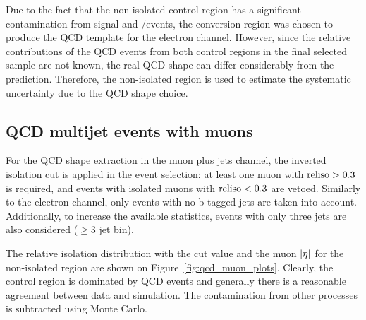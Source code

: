 Due to the fact that the non-isolated control region has a significant contamination from signal and \W/\ZpJets events,
the conversion region was chosen to produce the QCD template for the electron channel. However, since the relative
contributions of the QCD events from both control regions in the final selected sample are not known, the real QCD shape
can differ considerably from the prediction. Therefore, the non-isolated region is used to estimate the systematic
uncertainty due to the QCD shape choice.

\subsection{QCD multijet events with muons}
For the QCD shape extraction in the muon plus jets channel, the inverted isolation cut is applied in the event
selection: at least one muon with $\textrm{reliso}>0.3$ is required, and events with isolated muons with $\textrm{reliso}<0.3$ are
vetoed. Similarly to the electron channel, only events with no b-tagged jets are taken into account. Additionally, to
increase the available statistics, events with only three jets are also considered ($\geq 3$ jet bin).

The relative isolation distribution with the cut value and the muon $\lvert \eta \rvert$ for the non-isolated region are shown on
Figure~\ref{fig:qcd_muon_plots}. Clearly, the control region is dominated by QCD events and generally there is a
reasonable agreement between data and simulation. The contamination from other processes is subtracted using Monte
Carlo.

